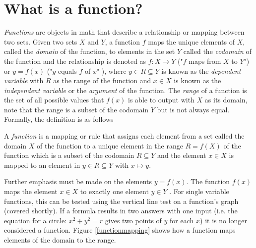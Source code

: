 \section{What is a function?}
\textit{Functions} are objects in math that describe a relationship or mapping between two sets. Given two sets $X$ and $Y$, a function $f$ maps the unique elements of $X$, called the \textit{domain} of the function, to elements in the set $Y$ called the \textit{codomain} of the function and the relationship is denoted as $f : X \to Y$ ("$f$ maps from $X$ to $Y$") or $y = f(x)$ ("$y$ equals $f$ of $x$" \cite{understandinganalysis}), where $y \in R \subseteq Y$ is known as the \textit{dependent variable} with $R$ as the range of the function and $x \in X$ is known as the \textit{independent variable} or the \textit{argument} of the function. The \textit{range} of a function is the set of all possible values that $f(x)$ is able to output with $X$ as its domain, note that the range is a subset of the codomain $Y$ but is not always equal. Formally, the definition is as follows

\begin{definition}
    A \textit{function} is a mapping or rule that assigns each element from a set called the domain $X$ of the function to a unique element in the range $R = f(X)$ of the function which is a subset of the codomain $R \subseteq Y$ and the element $x \in X$ is mapped to an element in $y \in R \subseteq Y$ with $x \mapsto y$.
\end{definition}

Further emphasis must be made on the elements $y = f(x)$. The function $f(x)$ maps the element $x \in X$ to exactly one element $y \in Y$ \cite{elemrealandcomplex}. For single variable functions, this can be tested using the vertical line test on a function's graph (covered shortly). If a formula results in two answers with one input (i.e. the equation for a circle: $x^2 + y^2 = r$ gives two points of $y$ for each $x$) it is no longer considered a function. Figure \ref{functionmapping} shows how a function maps elements of the domain to the range.

